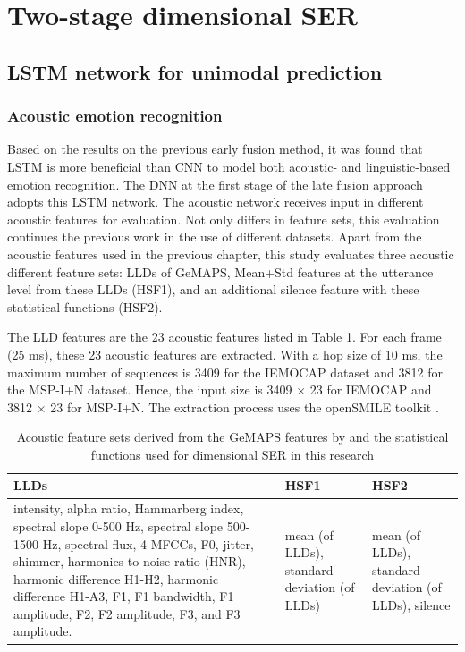 \section{Two-stage dimensional SER}

\subsection{LSTM network for unimodal prediction}
\subsubsection{Acoustic emotion recognition}

Based on the results on the previous early fusion method, it was found that
LSTM is more beneficial than CNN to model both acoustic- and
linguistic-based emotion recognition. The DNN at the first stage of the late
fusion approach adopts this LSTM network. The acoustic network receives input
in different acoustic features for evaluation. Not only differs in feature
sets, this evaluation continues the previous work \cite{Atmaja2020f} in the use
of different datasets.  Apart from the acoustic features used in the previous
chapter, this study evaluates three acoustic different feature sets: LLDs of
GeMAPS, Mean+Std features at the utterance level from these LLDs (HSF1), and an
additional silence feature with these statistical functions (HSF2).

The LLD features are the 23 acoustic features listed in Table
\ref{tab:aco_feature}. For each frame (25 ms), these 23 acoustic features are
extracted. With a hop size of 10 ms, the maximum number of sequences is 3409
for the IEMOCAP dataset and 3812 for the MSP-I+N dataset. Hence, the input size
is 3409 $\times$ 23 for IEMOCAP and 3812 $\times$ 23 for MSP-I+N. The
extraction process uses the openSMILE toolkit \cite{Eyben2016open}.

\begin{table}
\caption{Acoustic feature sets derived from the GeMAPS features by \cite{Eyben}
and the statistical functions used for dimensional SER in this research}
    \begin{center}
\begin{tabular}{p{6cm} p{4cm} p{4cm}}
    \hline
LLDs & HSF1 & HSF2 \\
\hline \hline
intensity, alpha ratio, Hammarberg index, spectral slope 0-500 Hz, spectral
slope 500-1500 Hz, spectral flux, 4 MFCCs, F0, jitter, shimmer,
harmonics-to-noise ratio (HNR), harmonic difference H1-H2, harmonic difference
H1-A3, F1, F1 bandwidth, F1 amplitude, F2, F2 amplitude, F3, and F3 amplitude.
& mean (of LLDs), standard deviation (of LLDs) & mean (of LLDs), standard
deviation (of LLDs), silence \\
    \hline
    \end{tabular}
    \end{center}
    \label{tab:aco_feature}
   \end{table}

